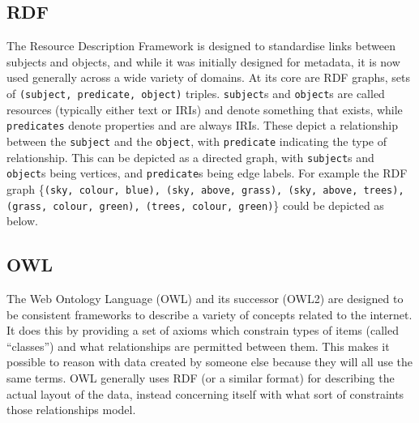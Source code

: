 \documentclass[english, 12pt]{article}
\begin{document}
\subsection{RDF}
The Resource Description Framework is designed to standardise links between subjects and objects, and while it was initially designed for metadata, it is now used generally across a wide variety of domains. At its core are RDF graphs, sets of \texttt{(subject, predicate, object)} triples. \texttt{subject}s and \texttt{object}s are called resources (typically either text or IRIs\cite{iri_rfc}) and denote something that exists, while \texttt{predicates} denote properties and are always IRIs. These depict a relationship between the \texttt{subject} and the \texttt{object}, with \texttt{predicate} indicating the type of relationship. This can be depicted as a directed graph, with \texttt{subject}s and \texttt{object}s being vertices, and \texttt{predicate}s being edge labels. For example the RDF graph \{\texttt{(sky, colour, blue), (sky, above, grass), (sky, above, trees), (grass, colour, green), (trees, colour, green)}\} could be depicted as below.
\begin{figure}[H]
\centering
{}
\end{figure}

\subsection{OWL}
The Web Ontology Language (OWL) and its successor (OWL2) are designed to be consistent frameworks to describe a variety of concepts related to the internet. It does this by providing a set of axioms which constrain types of items (called ``classes'') and what relationships are permitted between them. This makes it possible to reason with data created by someone else because they will all use the same terms. OWL generally uses RDF (or a similar format) for describing the actual layout of the data, instead concerning itself with what sort of constraints those relationships model.
\end{document}
